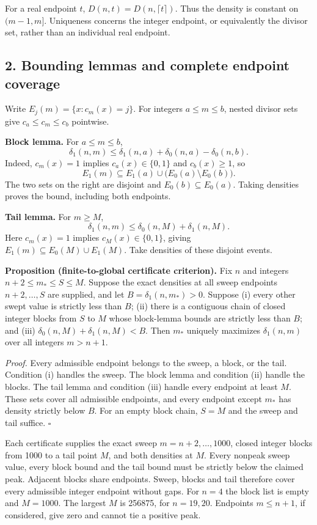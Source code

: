\documentclass[
  11pt,
]{article}
\begin{document}
For a real endpoint \(t\), \(D(n,t)=D(n,\lceil t\rceil)\). Thus the
density is constant on \((m-1,m]\). Uniqueness concerns the integer
endpoint, or equivalently the divisor set, rather than an individual
real endpoint.

\subsection{2. Bounding lemmas and complete endpoint
coverage}\label{bounding-lemmas-and-complete-endpoint-coverage}

Write \(E_j(m)=\{x:c_m(x)=j\}\). For integers \(a\le m\le b\), nested
divisor sets give \(c_a\le c_m\le c_b\) pointwise.

\textbf{Block lemma.} For \(a\le m\le b\),
\[\delta_1(n,m)\le\delta_1(n,a)+\delta_0(n,a)-\delta_0(n,b).\] Indeed,
\(c_m(x)=1\) implies \(c_a(x)\in\{0,1\}\) and \(c_b(x)\ge1\), so
\[E_1(m)\subseteq E_1(a)\cup\bigl(E_0(a)\setminus E_0(b)\bigr).\] The
two sets on the right are disjoint and \(E_0(b)\subseteq E_0(a)\).
Taking densities proves the bound, including both endpoints.

\textbf{Tail lemma.} For \(m\ge M\),
\[\delta_1(n,m)\le\delta_0(n,M)+\delta_1(n,M).\] Here \(c_m(x)=1\)
implies \(c_M(x)\in\{0,1\}\), giving
\(E_1(m)\subseteq E_0(M)\cup E_1(M)\). Take densities of these disjoint
events.

\textbf{Proposition (finite-to-global certificate criterion).} Fix \(n\)
and integers \(n+2\le m_*\le S\le M\). Suppose the exact densities at
all sweep endpoints \(n+2,\ldots,S\) are supplied, and let
\(B=\delta_1(n,m_*)>0\). Suppose (i) every other swept value is strictly
less than \(B\); (ii) there is a contiguous chain of closed integer
blocks from \(S\) to \(M\) whose block-lemma bounds are strictly less
than \(B\); and (iii) \(\delta_0(n,M)+\delta_1(n,M)<B\). Then \(m_*\)
uniquely maximizes \(\delta_1(n,m)\) over all integers \(m>n+1\).

\emph{Proof.} Every admissible endpoint belongs to the sweep, a block,
or the tail. Condition (i) handles the sweep. The block lemma and
condition (ii) handle the blocks. The tail lemma and condition (iii)
handle every endpoint at least \(M\). These sets cover all admissible
endpoints, and every endpoint except \(m_*\) has density strictly below
\(B\). For an empty block chain, \(S=M\) and the sweep and tail suffice.
\(\square\)

Each certificate supplies the exact sweep \(m=n+2,\ldots,1000\), closed
integer blocks from 1000 to a tail point \(M\), and both densities at
\(M\). Every nonpeak sweep value, every block bound and the tail bound
must be strictly below the claimed peak. Adjacent blocks share
endpoints. Sweep, blocks and tail therefore cover every admissible
integer endpoint without gaps. For \(n=4\) the block list is empty and
\(M=1000\). The largest \(M\) is 256875, for \(n=19,20\). Endpoints
\(m\le n+1\), if considered, give zero and cannot tie a positive peak.
\end{document}
